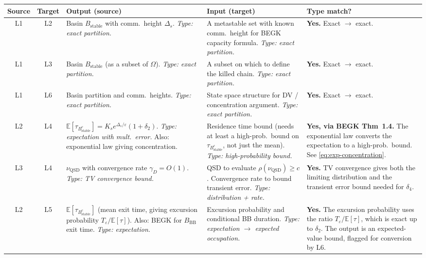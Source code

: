 \documentclass[11pt]{article}
\newcommand{\eps}{\varepsilon}
\newcommand{\Ds}{\Delta_s}
\newcommand{\Bstable}{B_{\mathrm{stable}}}
\newcommand{\BBB}{B_{\mathrm{BB}}}
\newcommand{\Teps}{T_\eps}
\newcommand{\QSD}{\mathrm{QSD}}
\begin{document}
\medskip
\begin{center}
\renewcommand{\arraystretch}{1.4}
\begin{tabular}{|c|c|p{4.2cm}|p{4.2cm}|p{3.0cm}|}
\hline
\textbf{Source} & \textbf{Target} & \textbf{Output (source)} & \textbf{Input (target)} & \textbf{Type match?} \\
\hline\hline

L1 & L2 &
  Basin $\Bstable$ with comm.\ height $\Ds$.
  \emph{Type: exact partition.} &
  A metastable set with known comm.\ height for BEGK capacity formula.
  \emph{Type: exact partition.} &
  \textbf{Yes.} Exact $\to$ exact. \\
\hline

L1 & L3 &
  Basin $\Bstable$ (as a subset of $\Omega$).
  \emph{Type: exact partition.} &
  A subset on which to define the killed chain.
  \emph{Type: exact partition.} &
  \textbf{Yes.} Exact $\to$ exact. \\
\hline

L1 & L6 &
  Basin partition and comm.\ heights.
  \emph{Type: exact partition.} &
  State space structure for DV / concentration argument.
  \emph{Type: exact partition.} &
  \textbf{Yes.} Exact $\to$ exact. \\
\hline

L2 & L4 &
  $\mathbb{E}[\tau_{\Bstable^c}] = K_s e^{\Ds/\eps}(1+\delta_2)$.
  \emph{Type: expectation with mult.\ error.}
  Also: exponential law giving concentration. &
  Residence time bound (needs at least a high-prob.\ bound on $\tau_{\Bstable^c}$, not just the mean).
  \emph{Type: high-probability bound.} &
  \textbf{Yes, via BEGK Thm~1.4.} The exponential law converts the expectation to a high-prob.\ bound. See \eqref{eq:exp-concentration}. \\
\hline

L3 & L4 &
  $\nu_\QSD$ with convergence rate $\gamma_D = O(1)$.
  \emph{Type: TV convergence bound.} &
  QSD to evaluate $\rho(\nu_\QSD) \geq c$.
  Convergence rate to bound transient error.
  \emph{Type: distribution + rate.} &
  \textbf{Yes.} TV convergence gives both the limiting distribution and the transient error bound needed for $\delta_4$. \\
\hline

L2 & L5 &
  $\mathbb{E}[\tau_{\Bstable^c}]$ (mean exit time, giving excursion probability $\Teps / \mathbb{E}[\tau]$).
  Also: BEGK for $\BBB$ exit time.
  \emph{Type: expectation.} &
  Excursion probability and conditional BB duration.
  \emph{Type: expectation $\to$ expected occupation.} &
  \textbf{Yes.} The excursion probability uses the ratio $\Teps / \mathbb{E}[\tau]$, which is exact up to $\delta_2$. The output is an expected-value bound, flagged for conversion by L6. \\
\hline


\end{tabular}
\end{center}
\end{document}
